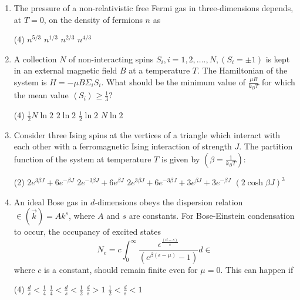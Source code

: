\begin{enumerate}
	\item The pressure of a non-relativistic free Fermi gas in three-dimensions depends, at $T=0$, on the density of fermions $n$ as
	{}
\begin{tasks}(4)
	\task[\textbf{A.}] $n^{5 / 3}$
	\task[\textbf{B.}] $n^{1 / 3}$
	\task[\textbf{C.}]  $n^{2 / 3}$
	\task[\textbf{D.}] $n^{4 / 3}$
\end{tasks}

	\item A collection $N$ of non-interacting spins $S_{i}, i=1,2, \ldots ., N,\left(S_{i}=\pm 1\right)$ is kept in an external magnetic field $B$ at a temperature $T .$ The Hamiltonian of the system is $H=-\mu B \Sigma_{i} S_{i} .$ What should be the minimum value of $\frac{\mu B}{k_{B} T}$ for which the mean value $\left\langle S_{i}\right\rangle \geq \frac{1}{3} ?$
	{}
\begin{tasks}(4)
	\task[\textbf{A.}]  $\frac{1}{2} N \ln 2$
	\task[\textbf{B.}] $2 \ln 2$
	\task[\textbf{C.}] $\frac{1}{2} \ln 2$
	\task[\textbf{D.}]  $N \ln 2$
\end{tasks}

	\item Consider three Ising spins at the vertices of a triangle which interact with each other with a ferromagnetic Ising interaction of strength $J .$ The partition function of the system at temperature $T$ is given by $\left(\beta=\frac{1}{k_{B} T}\right):$
	{}

\begin{tasks}(2)
	\task[\textbf{A.}]  $2 e^{3 \beta J}+6 e^{-\beta J}$
	\task[\textbf{B.}] $2 e^{-3 \beta J}+6 e^{\beta J}$
	\task[\textbf{C.}] $2 e^{3 \beta J}+6 e^{-3 \beta J}+3 e^{\beta J}+3 e^{-\beta J}$
	\task[\textbf{D.}] $(2 \cosh \beta J)^{3}$
\end{tasks}


	\item An ideal Bose gas in $d$-dimensions obeys the dispersion relation $\in(\vec{k})=A k^{s}$, where $A$ and $s$ are constants. For Bose-Einstein condensation to occur, the occupancy of excited states
	$$
	N_{e}=c \int_{0}^{\infty} \frac{\epsilon^{\frac{(d-s)}{s}}}{\left(e^{\beta(\epsilon-\mu)}-1\right)} d \in
	$$
	where $c$ is a constant, should remain finite even for $\mu=0$. This can happen if
	{}

\begin{tasks}(4)
	\task[\textbf{A.}] $\frac{d}{s}<\frac{1}{4}$
	\task[\textbf{B.}] $\frac{1}{4}<\frac{d}{s}<\frac{1}{2}$
	\task[\textbf{C.}] $\frac{d}{s}>1$
	\task[\textbf{D.}] $\frac{1}{2}<\frac{d}{s}<1$
\end{tasks}


\end{enumerate}

